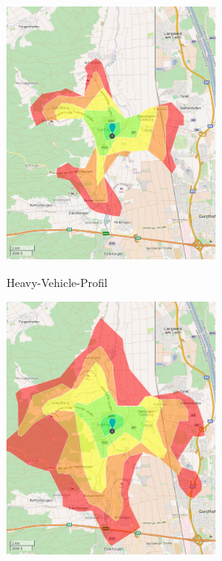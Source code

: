\begin{figure}[htb]
\centering
\begin{subfigure}{0.49\textwidth}
\centering
\includegraphics[width = 0.75\textwidth]{../media/isohgv.png} \\
\caption{Heavy-Vehicle-Profil}
\label{fig:isohgv}
\end{subfigure}
\begin{subfigure}{0.49\textwidth}
\centering
\includegraphics[width = 0.75\textwidth]{../media/isocar.png} \\

\end{subfigure}
\end{figure}

